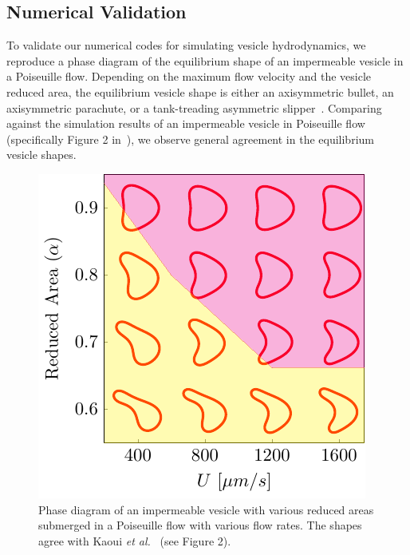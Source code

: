 \documentclass[prb,preprint,showpacs,preprintnumbers,amsmath,amssymb,longbibliography]{revtex4-1}
\newif\ifTikz
\begin{document}
\subsection{Numerical Validation\label{subsec:numerical_validation}}
To validate our numerical codes for simulating vesicle hydrodynamics, we
reproduce a phase diagram of the equilibrium shape of an impermeable
vesicle in a Poiseuille flow. Depending on the maximum flow velocity and
the vesicle reduced area, the equilibrium vesicle shape is either an
axisymmetric bullet, an axisymmetric parachute, or a tank-treading
asymmetric slipper~\cite{kao-bir-mis2009}. Comparing against the
simulation results of an impermeable vesicle in Poiseuille flow
(specifically Figure 2 in~\citet{kao-bir-mis2009}), we observe general
agreement in the equilibrium vesicle shapes.

\begin{figure}[htp]
  \centering
  \ifTikz
  
  \else
  \includegraphics{figures/parabolicImpermeable.pdf}
  \fi
  \caption{\label{fig:PoiseuillePhase} Phase diagram of an impermeable
  vesicle with various reduced areas submerged in a Poiseuille flow with
  various flow rates. The shapes agree with Kaoui {\em et
  al.}~\cite{kao-bir-mis2009} (see Figure 2).}
\end{figure}

\end{document}

